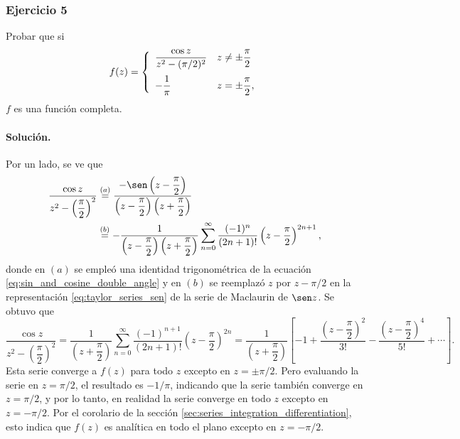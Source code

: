 \documentclass[a4paper]{report}
\begin{document}
\subsubsection*{Ejercicio 5}

Probar que si
\[
 f(z)=
 \left\{ 
 \begin{array}{ll}
  \dfrac{\cos z}{z^2-(\pi/2)^2} & z\neq\pm\dfrac{\pi}{2}\\[\bigskipamount]
  -\dfrac{1}{\pi} & z=\pm\dfrac{\pi}{2},
 \end{array}
 \right.
\]
\(f\) es una función completa. 

\paragraph{Solución.} Por un lado, se ve que 
\begin{align*}
 \dfrac{\cos z}{z^2-\left(\dfrac{\pi}{2}\right)^2}&\overset{(a)}{=}\dfrac{-\sen\left(z-\dfrac{\pi}{2}\right)}{\left(z-\dfrac{\pi}{2}\right)\left(z+\dfrac{\pi}{2}\right)}\\
 &\overset{(b)}{=}-\dfrac{1}{\left(z-\dfrac{\pi}{2}\right)\left(z+\dfrac{\pi}{2}\right)}\sum_{n=0}^\infty\frac{(-1)^n}{(2n+1)!}\left(z-\dfrac{\pi}{2}\right)^{2n+1},
\end{align*}
donde en \((a)\) se empleó una identidad trigonométrica de la ecuación \ref{eq:sin_and_cosine_double_angle} y en \((b)\) se reemplazó \(z\) por \(z-\pi/2\) en la representación \ref{eq:taylor_series_sen} de la serie de Maclaurin de \(\sen z\). Se obtuvo que 
\[
 \dfrac{\cos z}{z^2-\left(\dfrac{\pi}{2}\right)^2}=\dfrac{1}{\left(z+\dfrac{\pi}{2}\right)}\sum_{n=0}^\infty\frac{(-1)^{n+1}}{(2n+1)!}\left(z-\dfrac{\pi}{2}\right)^{2n}
 =\dfrac{1}{\left(z+\dfrac{\pi}{2}\right)}\left[-1+\dfrac{\left(z-\dfrac{\pi}{2}\right)^2}{3!}-\dfrac{\left(z-\dfrac{\pi}{2}\right)^4}{5!}+\cdots\right].
\]
Esta serie converge a \(f(z)\) para todo \(z\) excepto en \(z=\pm\pi/2\). Pero evaluando la serie en \(z=\pi/2\), el resultado es \(-1/\pi\), indicando que la serie también converge en \(z=\pi/2\), y por lo tanto, en realidad la serie converge en todo \(z\) excepto en  \(z=-\pi/2\). Por el corolario de la sección \ref{sec:series_integration_differentiation}, esto indica que \(f(z)\) es analítica en todo el plano excepto en \(z=-\pi/2\). 
\end{document}
